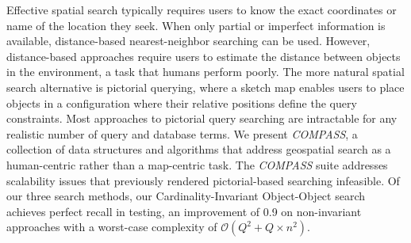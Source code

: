 

Effective spatial search typically requires users to know the exact coordinates or name of the location they seek.
When only partial or imperfect information is available, distance-based nearest-neighbor searching can be used.
However, distance-based approaches require users to estimate the distance between objects in the environment, a task that humans perform poorly.
The more natural spatial search alternative is pictorial querying, where a sketch map enables users to place objects in a configuration where their relative positions define the query constraints.
Most approaches to pictorial query searching are intractable for any realistic number of query and database terms.
We present \emph{COMPASS}, a collection of data structures and algorithms that address geospatial search as a human-centric rather than a map-centric task. 
The \emph{COMPASS} suite addresses scalability issues that previously rendered pictorial-based searching infeasible. 
Of our three search methods, our Cardinality-Invariant Object-Object search achieves perfect recall in testing, an improvement of 0.9 on non-invariant approaches with a worst-case complexity of $\mathcal{O}(Q^2 + Q\times n^2)$.






